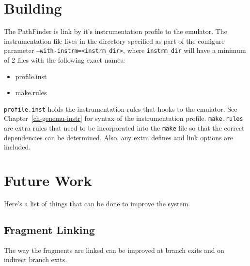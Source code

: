 \section{Building}
The PathFinder is link by it's instrumentation profile to the emulator.  The
instrumentation file lives in the directory specified as part of the configure
parameter \texttt{--with-instrm=<instrm\_dir>}, where \texttt{instrm\_dir} 
will have a minimum of 2 files with the following exact names:
\begin{itemize}
\item profile.inst
\item make.rules
\end{itemize}

\texttt{profile.inst} holds the instrumentation rules that hooks to the
emulator.
See Chapter~\ref{ch-genemu-instr} for syntax of the instrumentation profile.
\texttt{make.rules} are extra rules that need to be incorporated into the 
\texttt{make} file so that the correct dependencies can be determined.
Also, any extra defines and link options are included.


\section{Future Work}
\label{sec-futurework}

Here's a list of things that can be done to improve the system. 

\subsection{Fragment Linking}
The way the fragments are linked can be improved at branch exits and 
on indirect branch exits. 

